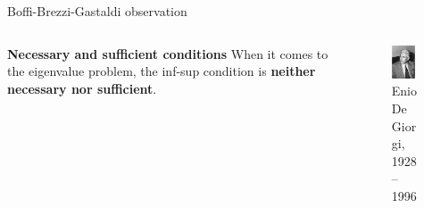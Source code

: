 \documentclass{beamer}
\begin{document}
	\begin{frame}{Boffi-Brezzi-Gastaldi observation}
		\begin{columns}[T] 
			\begin{column}{0.65\textwidth} 
			
			\vspace{0.2cm} 
			\begin{alertblock}{\textbf{Necessary and sufficient conditions}}
				When it comes to the eigenvalue problem, the inf-sup condition is \textbf{neither necessary nor sufficient}.
			\end{alertblock}
			\end{column} 
			
			\begin{column}{0.35\textwidth} 
				\begin{figure} 
					\centering 
					\includegraphics[width=0.8\textwidth]{Figures/DeGiorgi.jpg} 
					\caption*{\tiny{Enio De Giorgi, 1928--1996}} 
				\end{figure} 
			\end{column} 
		\end{columns} 
	\end{frame}
\end{document}
